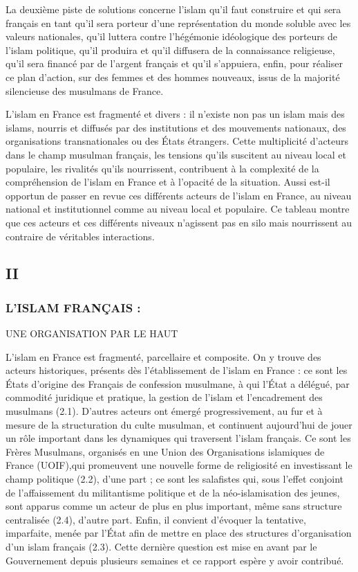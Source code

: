 La deuxième piste de solutions concerne l'islam qu'il faut construire et
qui sera français en tant qu'il sera porteur d'une représentation du
monde soluble avec les valeurs nationales, qu'il luttera contre
l'hégémonie idéologique des porteurs de l'islam politique, qu'il
produira et qu'il diffusera de la connaissance religieuse, qu'il sera
financé par de l'argent français et qu'il s'appuiera, enfin, pour
réaliser ce plan d'action, sur des femmes et des hommes nouveaux, issus
de la majorité silencieuse des musulmans de France.

L'islam en France est fragmenté et divers : il n'existe non pas un islam
mais des islams, nourris et diffusés par des institutions et des
mouvements nationaux, des organisations transnationales ou des États
étrangers. Cette multiplicité d'acteurs dans le champ musulman français,
les tensions qu'ils suscitent au niveau local et populaire, les
rivalités qu'ils nourrissent, contribuent à la complexité de la
compréhension de l'islam en France et à l'opacité de la situation. Aussi
est-il opportun de passer en revue ces différents acteurs de l'islam en
France, au niveau national et institutionnel comme au niveau local et
populaire. Ce tableau montre que ces acteurs et ces différents niveaux
n'agissent pas en silo mais nourrissent au contraire de véritables
interactions.


\hypertarget{ii}{%
\subsection{II}\label{ii}}

\hypertarget{lislam-franuxe7ais}{%
\subsubsection{L'ISLAM FRANÇAIS :}\label{lislam-franuxe7ais}}


UNE ORGANISATION PAR LE HAUT

L'islam en France est fragmenté, parcellaire et composite. On y trouve
des acteurs historiques, présents dès l'établissement de l'islam en
France : ce sont les États d'origine des Français de confession
musulmane, à qui l'État a délégué, par commodité juridique et pratique,
la gestion de l'islam et l'encadrement des musulmans (2.1). D'autres
acteurs ont émergé progressivement, au fur et à mesure de la
structuration du culte musulman, et continuent aujourd'hui de jouer un
rôle important dans les dynamiques qui traversent l'islam français. Ce
sont les Frères Musulmans, organisés en une Union des Organisations
islamiques de France (UOIF),qui promeuvent une nouvelle forme de
religiosité en investissant le champ politique (2.2), d'une part ; ce
sont les salafistes qui, sous l'effet conjoint de l'affaissement du
militantisme politique et de la néo-islamisation des jeunes, sont
apparus comme un acteur de plus en plus important, même sans structure
centralisée (2.4), d'autre part. Enfin, il convient d'évoquer la
tentative, imparfaite, menée par l'État afin de mettre en place des
structures d'organisation d'un islam français (2.3). Cette dernière
question est mise en avant par le Gouvernement depuis plusieurs semaines
et ce rapport espère y avoir contribué.


